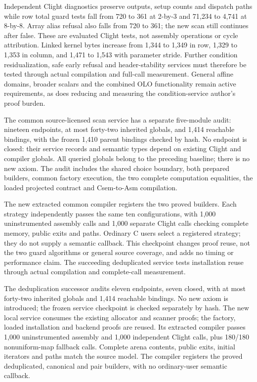 Independent Clight diagnostics preserve outputs, setup counts and dispatch
paths while row total guard tests fall from 720 to 361 at 2-by-3 and
71,234 to 4,741 at 8-by-8. Array alias refusal also falls from 720 to 361;
the new scan still continues after false. These are evaluated Clight tests,
not assembly operations or cycle attribution. Linked kernel bytes increase
from 1,344 to 1,349 in row, 1,329 to 1,353 in column, and 1,471 to 1,543 with
parameter stride. Further condition residualization, safe early refusal and
header-stability services must therefore be tested through actual compilation
and full-call measurement. General affine domains, broader scalars and the
combined OLO functionality remain active requirements, as does reducing and
measuring the condition-service author's proof burden.

The common source-licensed scan service has a separate five-module audit:
nineteen endpoints, at most forty-two inherited globals, and 1,414 reachable
bindings, with the frozen 1,410 parent bindings checked by hash. No endpoint
is closed: their service records and semantic types depend on existing Clight
and compiler globals. All queried globals belong to the preceding baseline;
there is no new axiom. The audit includes the shared choice boundary, both
prepared builders, common factory execution, the two complete computation
equalities, the loaded projected contract and Csem-to-Asm compilation.

The new extracted common compiler registers the two proved builders. Each
strategy independently passes the same ten configurations, with 1,000
uninstrumented assembly calls and 1,000 separate Clight calls checking complete
memory, public exits and paths. Ordinary C users select a registered strategy;
they do not supply a semantic callback. This checkpoint changes proof reuse,
not the two guard algorithms or general source coverage, and adds no timing
or performance claim. The succeeding deduplicated service tests installation
reuse through actual compilation and complete-call measurement.

The deduplication successor audits eleven endpoints, seven closed, with at
most forty-two inherited globals and 1,414 reachable bindings. No new axiom
is introduced; the frozen service checkpoint is checked separately by hash.
The new local service consumes the existing allocator and scanner proofs;
the factory, loaded installation and backend proofs are reused. Its extracted
compiler passes 1,000 uninstrumented assembly and 1,000 independent Clight
calls, plus 180/180 nonuniform-map fallback calls. Complete arena contents,
public exits, initial iterators and paths match the source model. The compiler
registers the proved deduplicated, canonical and pair builders, with no
ordinary-user semantic callback.

